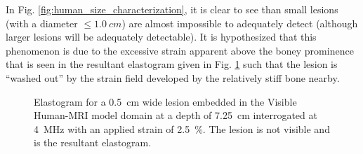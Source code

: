 			In Fig. \ref{fig:human_size_characterization}, it is clear to see than small lesions (with a diameter $\leq \SI{1.0}{cm}$) are almost impossible to adequately detect (although larger lesions will be adequately detectable). It is hypothesized that this phenomenon is due to the excessive strain apparent above the boney prominence that is seen in the resultant elastogram given in Fig. \ref{fig:human_elastogram} such that the lesion is ``washed out'' by the strain field developed by the relatively stiff bone nearby.

			\begin{figure}[!t]
				\centering
				\caption[Elastogram of a Visible Human-MRI model]{Elastogram for a \SI{0.5}{cm} wide lesion embedded in the Visible Human-MRI model domain at a depth of \SI{7.25}{cm} interrogated at \SI{4}{MHz} with an applied strain of \SI{2.5}{\percent}. The lesion is not visible and is the resultant elastogram.}
				\label{fig:human_elastogram}
			\end{figure}

